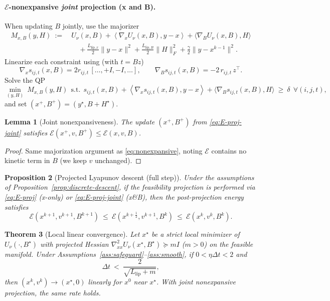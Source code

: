\documentclass[11pt]{article}
\newtheorem{theorem}{Theorem}[section]
\newtheorem{proposition}[theorem]{Proposition}
\newtheorem{lemma}[theorem]{Lemma}
\theoremstyle{remark}
\theoremstyle{definition}
\newcommand{\inner}[2]{\left\langle #1, #2 \right\rangle}
\newcommand{\Llip}{L_{\text{lip}}}
\newcommand{\Llipx}{L_{\text{lip},x}}
\newcommand{\LlipB}{L_{\text{lip},B}}
\begin{document}
\paragraph{\(\mathcal{E}\)-nonexpansive \emph{joint} projection (x and B).}\label{sec:bupdate}
When updating $B$ jointly, use the majorizer
\begin{align}
M_{x,B}(y,H)\ :=\ &U_\nu(x,B)+\inner{\nabla_x U_\nu(x,B)}{y-x}+\langle \nabla_B U_\nu(x,B), H\rangle \nonumber\\
&\quad +\tfrac{\Llipx}{2}\|y-x\|^2+\tfrac{\LlipB}{2}\|H\|_F^2+\tfrac{\gamma}{2}\|y-x^{k-1}\|^2. \label{eq:joint-majorizer}
\end{align}
Linearize each constraint using (with $t=Bz$)
\[
\nabla_x s_{ij,t}(x,B)=2r_{ij,t}\,[\dots,+I,-I,\dots],\qquad
\nabla_B s_{ij,t}(x,B)=-2\,r_{ij,t}\,z^\top.
\]
Solve the QP
\begin{equation}\label{eq:E-proj-joint}
\min_{(y,H)}\ M_{x,B}(y,H)\ \ \text{s.t.}\ \ s_{ij,t}(x,B)+\inner{\nabla_x s_{ij,t}(x,B)}{y-x}+\langle \nabla_B s_{ij,t}(x,B),H\rangle \ \ge\ \delta\ \ \forall(i,j,t),
\end{equation}
and set $(x^+,B^+)=(y^\star,B+H^\star)$.
\begin{lemma}[Joint nonexpansiveness]\label{lem:joint-nonexpansive}
The update $(x^+,B^+)$ from \eqref{eq:E-proj-joint} satisfies $\mathcal{E}(x^+,v,B^+)\le \mathcal{E}(x,v,B)$.
\end{lemma}
\begin{proof}
Same majorization argument as \eqref{eq:nonexpansive}, noting $\mathcal{E}$ contains no kinetic term in $B$ (we keep $v$ unchanged).
\end{proof}

\begin{proposition}[Projected Lyapunov descent (full step)]\label{prop:projected-descent}
Under the assumptions of Proposition~\ref{prop:discrete-descent}, if the feasibility projection is performed via \eqref{eq:E-proj} (x-only) or \eqref{eq:E-proj-joint} (x\&B), then the \emph{post-projection} energy satisfies
\[
\mathcal{E}(x^{k+1},v^{k+1},B^{k+1})\ \le\ \mathcal{E}(x^{k+\frac12},v^{k+1},B^{k})\ \le\ \mathcal{E}(x^{k},v^{k},B^{k}).
\]
\end{proposition}

\begin{theorem}[Local linear convergence]\label{thm:local-linear}
Let $x^\star$ be a strict local minimizer of $U_\nu(\cdot,B^\star)$ with projected Hessian $\nabla^2_{xx} U_\nu(x^\star,B^\star)\succeq m I$ ($m>0$) on the feasible manifold. Under Assumptions~\ref{ass:safeguard}--\ref{ass:smooth}, if $0<\eta\Delta t<2$ and
\begin{equation}\label{eq:ll-explicit}
\Delta t\ <\ \frac{2}{\sqrt{\Llip+m}},
\end{equation}
then $(x^k,v^k)\to(x^\star,0)$ linearly for $x^0$ near $x^\star$. With joint nonexpansive projection, the same rate holds.
\end{theorem}
\end{document}
